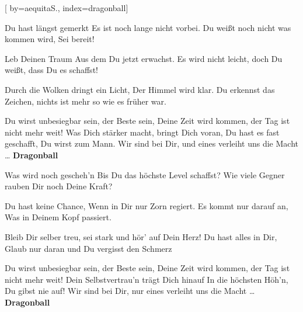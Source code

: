 
[%
    by={aequitaS.},
    index={dragonball}]


    \label{dragonball}

    \beginverse
        Du hast l\"{a}ngst gemerkt
        Es ist noch lange nicht vorbei.
        Du wei\ss{}t noch nicht was kommen wird,
        Sei bereit!

        Leb Deinen Traum
        Aus dem Du jetzt erwachst.
        Es wird nicht leicht,
        doch Du wei\ss{}t, dass Du es schaffst!
    \endverse

    \beginverse*
        Durch die Wolken dringt ein Licht,
        Der Himmel wird klar.
        Du erkennst das Zeichen,
        nichts ist mehr so wie es fr\"{u}her war.
    \endverse

    \beginchorus
        Du wirst unbesiegbar sein, der Beste sein,
        Deine Zeit wird kommen, der Tag ist nicht mehr weit!
        Was Dich st\"{a}rker macht, bringt Dich voran,
        Du hast es fast geschafft, Du wirst zum Mann.
        Wir sind bei Dir, und eines verleiht uns die Macht \ldots
        \textbf{Dragonball}
    \endchorus

    \beginverse
        Was wird noch gescheh'n
        Bis Du das h\"{o}chste Level schaffst?
        Wie viele Gegner rauben
        Dir noch Deine Kraft?

        Du hast keine Chance,
        Wenn in Dir nur Zorn regiert.
        Es kommt nur darauf an,
        Was in Deinem Kopf passiert.
    \endverse

    \beginverse*
        Bleib Dir selber treu, sei stark
        und h\"{o}r' auf Dein Herz!
        Du hast alles in Dir,
        Glaub nur daran und Du vergisst den Schmerz
    \endverse

    \beginchorus
        Du wirst unbesiegbar sein, der Beste sein,
        Deine Zeit wird kommen, der Tag ist nicht mehr weit!
        Dein Selbstvertrau'n tr\"{a}gt Dich hinauf
        In die h\"{o}chsten H\"{o}h'n, Du gibst nie auf!
        Wir sind bei Dir, nur eines verleiht uns die Macht \ldots
        \textbf{Dragonball}
    \endchorus
\endsong
